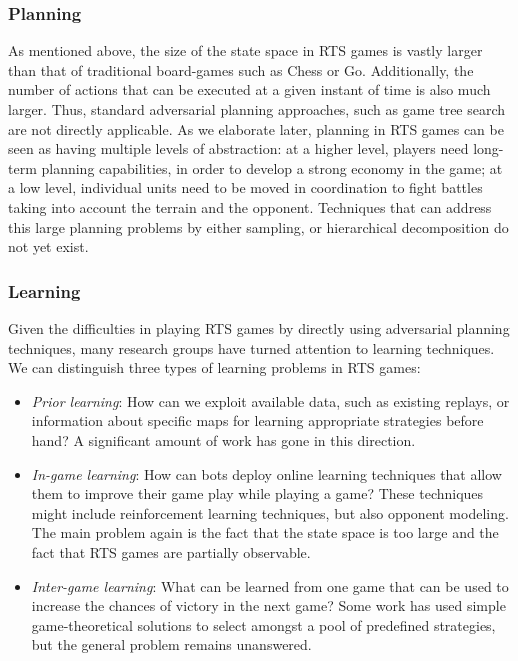 \documentclass[journal]{IEEEtran}
\begin{document}
\subsubsection{Planning}
As mentioned above, the size of the state space in RTS games is vastly larger than that of traditional board-games such as Chess or Go. Additionally, the number of actions that can be executed at a given instant of time is also much larger. Thus, standard adversarial planning approaches, such as game tree search are not directly applicable. As we elaborate later, planning in RTS games can be seen as having multiple levels of abstraction: at a higher level, players need long-term planning capabilities, in order to develop a strong economy in the game; at a low level, individual units need to be moved in coordination to fight battles taking into account the terrain and the opponent. Techniques that can address this large planning problems by either sampling, or hierarchical decomposition do not yet exist.

\subsubsection{Learning}
Given the difficulties in playing RTS games by directly using adversarial planning techniques, many research groups have turned attention to learning techniques. We can distinguish three types of learning problems in RTS games:
\begin{itemize}
\item {\em Prior learning}: How can we exploit available data, such as existing replays, or information about specific maps for learning appropriate strategies before hand? A significant amount of work has gone in this direction.%
\item {\em In-game learning}: How can bots deploy online learning techniques that allow them to improve their game play while playing a game? These techniques might include reinforcement learning techniques, but also opponent modeling. The main problem again is the fact that the state space is too large and the fact that RTS games are partially observable.
\item {\em Inter-game learning}: What can be learned from one game that can be used to increase the chances of victory in the next game? Some work has used simple game-theoretical solutions to select amongst a pool of predefined strategies, but the general problem remains unanswered.
\end{itemize}
\end{document}
